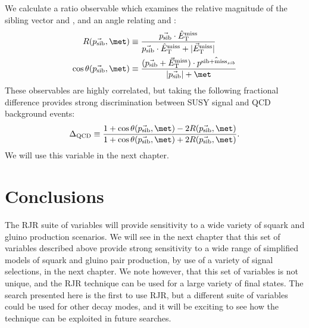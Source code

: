 We calculate a ratio observable which examines the relative magnitude of the sibling vector \psib and \met, and an angle relating \psib and \met:
\begin{align}
R( \psib, \met )          & \equiv \frac{\psib \cdot \methat}{ \psib \cdot \methat + |\metvec|} \\
\cos{\theta(\psib, \met)} & \equiv \frac{ (\psib + \metvec) \cdot \hat{p^{\text{sib+miss}_{sib}}}}{|\psib| + \met}
\end{align}
These observables are highly correlated, but taking the following fractional difference provides strong discrimination between SUSY signal and QCD background events:
\begin{align}
\Delta_{\mathrm{QCD}} \equiv \frac{1 + \cos{\theta(\psib, \met)} - 2 R(\psib, \met) }{1 + \cos{\theta(\psib, \met)} + 2 R(\psib, \met) }.
\end{align}
We will use this variable in the next chapter.

\section{Conclusions}

The RJR suite of variables will provide sensitivity to a wide variety of squark and gluino production scenarios.
We will see in the next chapter that this set of variables described above provide strong sensitivity to a wide range of simplified models of squark and gluino pair production, by use of a variety of signal selections, in the next chapter.
We note however, that this set of variables is not unique, and the RJR technique can be used for a large variety of final states.
The search presented here is the first to use RJR, but a different suite of variables could be used for other decay modes, and it will be exciting to see how the technique can be exploited in future searches.